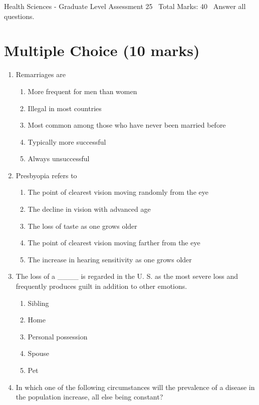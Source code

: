 \documentclass[12pt]{article}
\begin{document}
\begin{center}
Health Sciences - Graduate Level Assessment 25 \
Total Marks: 40 \
Answer all questions.
\end{center}

\section*{Multiple Choice (10 marks)}
\begin{enumerate}[label=\arabic*.]
\item Remarriages are
\begin{enumerate}[label=(\alph*)]
    \item More frequent for men than women
    \item Illegal in most countries
    \item Most common among those who have never been married before
    \item Typically more successful
    \item Always unsuccessful
\end{enumerate}
\item Presbyopia refers to
\begin{enumerate}[label=(\alph*)]
    \item The point of clearest vision moving randomly from the eye
    \item The decline in vision with advanced age
    \item The loss of taste as one grows older
    \item The point of clearest vision moving farther from the eye
    \item The increase in hearing sensitivity as one grows older
\end{enumerate}
\item The loss of a \_\_\_\_ is regarded in the U. S. as the most severe loss and frequently produces guilt in addition to other emotions.
\begin{enumerate}[label=(\alph*)]
    \item Sibling
    \item Home
    \item Personal possession
    \item Spouse
    \item Pet
\end{enumerate}
\item In which one of the following circumstances will the prevalence of a disease in the population increase, all else being constant?
\begin{enumerate}[label=(\alph*)]

\end{enumerate}
\end{enumerate}
\end{document}

